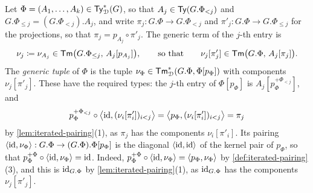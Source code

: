 \begin{definition}\label{def:generic-term}
    Let $\Phi = (A_1, \ldots, A_k) \in \mathsf{Ty}^*_{\mathcal{D}}(G)$, so that $A_j \in \mathsf{Ty}(G.\Phi_{<j})$ and $G.\Phi_{\leq j} = (G.\Phi_{<j}).A_j$, and write $\pi_j : G.\Phi \to G.\Phi_{<j}$ and $\pi'_j : G.\Phi \to G.\Phi_{\leq j}$ for the projections, so that $\pi_j = p_{A_j} \circ \pi'_j$. The generic term of the $j$-th entry is
    \[
        \nu_j \coloneqq \nu_{A_j} \in \mathsf{Tm}\big(G.\Phi_{\leq j},\, A_j[p_{A_j}]\big), \qquad \text{so that} \qquad \nu_j[\pi'_j] \in \mathsf{Tm}\big(G.\Phi,\, A_j[\pi_j]\big).
    \]
    The \emph{generic tuple} of $\Phi$ is the tuple $\nu_\Phi \in \mathsf{Tm}^*_{\mathcal{D}}(G.\Phi, \Phi[p_\Phi])$ with components $\nu_j[\pi'_j]$. These have the required types: the $j$-th entry of $\Phi[p_\Phi]$ is $A_j[p_\Phi^{+\Phi_{<j}}]$, and
    \[
        p_\Phi^{+\Phi_{<j}} \circ \big\langle \mathrm{id}, (\nu_i[\pi'_i])_{i<j} \big\rangle = \big\langle p_\Phi, (\nu_i[\pi'_i])_{i<j} \big\rangle = \pi_j
    \]
    by \cref{lem:iterated-pairing}(1), as $\pi_j$ has the components $\nu_i[\pi'_i]$. Its pairing $\langle \mathrm{id}, \nu_\Phi \rangle : G.\Phi \to (G.\Phi).\Phi[p_\Phi]$ is the diagonal $\langle \mathrm{id}, \mathrm{id} \rangle$ of the kernel pair of $p_\Phi$, so that $p_\Phi^{+\Phi} \circ \langle \mathrm{id}, \nu_\Phi \rangle = \mathrm{id}$. Indeed, $p_\Phi^{+\Phi} \circ \langle \mathrm{id}, \nu_\Phi \rangle = \langle p_\Phi, \nu_\Phi \rangle$ by \cref{def:iterated-pairing}(3), and this is $\mathrm{id}_{G.\Phi}$ by \cref{lem:iterated-pairing}(1), as $\mathrm{id}_{G.\Phi}$ has the components $\nu_j[\pi'_j]$.
\end{definition}

